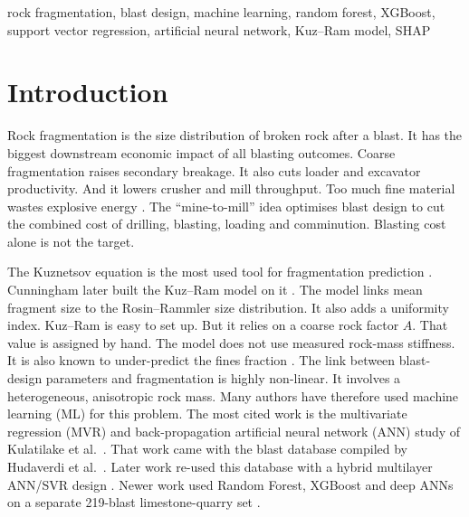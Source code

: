 \documentclass[conference]{IEEEtran}
\begin{document}
\begin{IEEEkeywords}
rock fragmentation, blast design, machine learning, random forest, XGBoost,
support vector regression, artificial neural network, Kuz--Ram model, SHAP
\end{IEEEkeywords}














\section{Introduction}
Rock fragmentation is the size distribution of broken rock after a blast. It has the biggest downstream economic impact of all blasting outcomes. Coarse fragmentation raises secondary breakage. It also cuts loader and excavator productivity. And it lowers crusher and mill throughput. Too much fine material wastes explosive energy \cite{kulatilake2010}. The ``mine-to-mill'' idea optimises blast design to cut the combined cost of drilling, blasting, loading and comminution. Blasting cost alone is not the target.

The Kuznetsov equation is the most used tool for fragmentation prediction \cite{kuznetsov1973}. Cunningham later built the Kuz--Ram model on it \cite{cunningham1983,cunningham2005}. The model links mean fragment size to the Rosin--Rammler size distribution. It also adds a uniformity index. Kuz--Ram is easy to set up. But it relies on a coarse rock factor $A$. That value is assigned by hand. The model does not use measured rock-mass stiffness. It is also known to under-predict the fines fraction \cite{gebretsadik2024}. The link between blast-design parameters and fragmentation is highly non-linear. It involves a heterogeneous, anisotropic rock mass. Many authors have therefore used machine learning (ML) for this problem. The most cited work is the multivariate regression (MVR) and back-propagation artificial neural network (ANN) study of Kulatilake et al.\ \cite{kulatilake2010}. That work came with the blast database compiled by Hudaverdi et al.\ \cite{hudaverdi2011}. Later work re-used this database with a hybrid multilayer ANN/SVR design \cite{amoako2022}. Newer work used Random Forest, XGBoost and deep ANNs on a separate 219-blast limestone-quarry set \cite{gebretsadik2024}.
\end{document}
